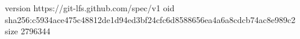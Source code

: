 version https://git-lfs.github.com/spec/v1
oid sha256:c5934ace475c48812de1d94ed3bf24cfc6d8588656ea4a6a8cdcb74ac8e989c2
size 2796344
